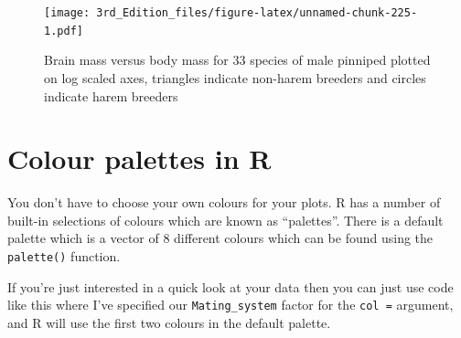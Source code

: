 \documentclass[
]{book}
\newenvironment{Shaded}{\begin{snugshade}}{\end{snugshade}}
\newcommand{\DataTypeTok}[1]{\textcolor[rgb]{0.13,0.29,0.53}{#1}}
\newcommand{\DecValTok}[1]{\textcolor[rgb]{0.00,0.00,0.81}{#1}}
\newcommand{\KeywordTok}[1]{\textcolor[rgb]{0.13,0.29,0.53}{\textbf{#1}}}
\newcommand{\NormalTok}[1]{#1}
\newcommand{\OperatorTok}[1]{\textcolor[rgb]{0.81,0.36,0.00}{\textbf{#1}}}
\newcommand{\StringTok}[1]{\textcolor[rgb]{0.31,0.60,0.02}{#1}}
\begin{document}
\begin{figure}
\centering
\texttt{[image: 3rd\_Edition\_files/figure-latex/unnamed-chunk-225-1.pdf]}
\caption{\label{fig:unnamed-chunk-225}Brain mass versus body mass for 33 species of male pinniped plotted on log scaled axes, triangles indicate non-harem breeders and circles indicate harem breeders}
\end{figure}

\hypertarget{colour-palettes-in-r}{%
\section{Colour palettes in R}\label{colour-palettes-in-r}}

You don't have to choose your own colours for your plots. R has a number of built-in selections of colours which are known as ``palettes''. There is a default palette which is a vector of 8 different colours which can be found using the \texttt{palette()} function.

\begin{Shaded}
\end{Shaded}

If you're just interested in a quick look at your data then you can just use code like this where I've specified our \texttt{Mating\_system} factor for the \texttt{col\ =} argument, and R will use the first two colours in the default palette.

\begin{Shaded}
\end{Shaded}
\end{document}
